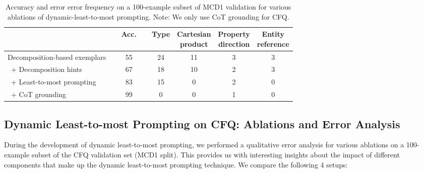 \documentclass{article} \usepackage{iclr2022_conference,times}
\begin{document}
\begin{table}[h]
\setlength\tabcolsep{4pt}
\begin{center}
\begin{tabular}{ l | c | c c c c }
\toprule
 & ~~Acc.~~ & \parbox[c]{15mm}{\centering Type} & 
\parbox[c]{15mm}{\centering Cartesian \\ product} &
\parbox[c]{15mm}{\centering Property \\ direction} & 
\parbox[c]{15mm}{\centering Entity \\ reference} \\
\midrule
Decomposition-based exemplars & 55 & 24 & 11 & 3 & 3 \\
\ + Decomposition hints & 67 & 18 & 10 & 2 & 3 \\
\ + Least-to-most prompting   & 83 & 15 & 0  & 2 & 0 \\
\ + CoT grounding   & 99 & 0  & 0  & 1 & 0 \\
\bottomrule
\end{tabular}
\end{center}
\caption{Accuracy and error error frequency on a 100-example subset of MCD1 validation for various ablations of dynamic-least-to-most prompting. Note: We only use CoT grounding for CFQ.}
\label{tab:ablation_l2m}
\end{table}


\subsection{Dynamic Least-to-most Prompting on CFQ: Ablations and Error Analysis}
\label{app:l2m_ablations_error_analysis}

During the development of dynamic least-to-most prompting, we performed a qualitative error analysis for various ablations on a 100-example subset of the CFQ validation set (MCD1 split). This provides us with interesting insights about the impact of different components that make up the dynamic least-to-most prompting technique. We compare the following 4 setups:
\end{document}

